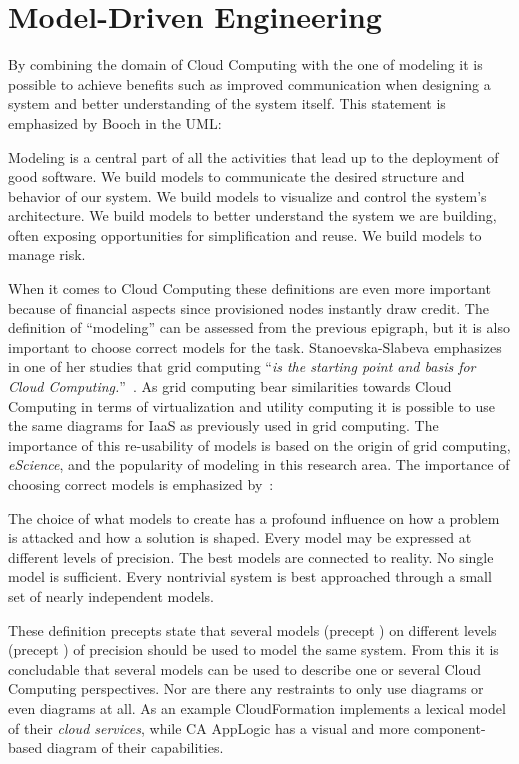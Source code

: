 \section{Model-Driven Engineering}

By combining the domain of Cloud Computing with the one of modeling 
it is possible to achieve benefits such as improved communication when designing 
a system and better understanding of the system itself.
This statement is emphasized by Booch \etal in the UML:
\epigraph{
  Modeling is a central
  part of all the activities that lead up to the deployment of good
  software. We build models to communicate the desired structure and
  behavior of our system. We build models to visualize and control the
  system's architecture. We build models to better understand the
  system we are building, often exposing opportunities for
  simplification and reuse. We build models to manage risk.
}{\citet{unified:booch05}}
When it comes to Cloud Computing these definitions are even more important
because of financial aspects since provisioned nodes instantly draw credit.
The definition of ``modeling'' can be assessed from the previous epigraph, but it is 
also important to choose correct models for the task.
Stanoevska-Slabeva emphasizes in one of her studies that grid computing
``\emph{is the starting point and basis for Cloud Computing.}''~\cite{introduction:wozniak10}.
As grid computing bear similarities towards Cloud Computing in terms of virtualization 
and utility computing
it is possible to use the same  diagrams for IaaS as previously used in grid computing.
The importance of this re-usability of models is based on the origin of grid computing, 
\emph{eScience},
and the popularity of modeling in this research area.
The importance of choosing correct models is emphasized by~\cite{unified:booch05}:
\epigraph{
  \begin{ii}\iitem The choice
  of what models to create has a profound influence on how a problem
  is attacked and how a solution is shaped. \iitem Every model may be
  expressed at different levels of precision. \iitem The best models
  are connected to reality. \iitem No single model is
  sufficient. Every nontrivial system is best approached through a
  small set of nearly independent models.\end{ii}
}{\citet{unified:booch05}}
These definition precepts state that several models (precept ) on different levels (precept ) 
of precision should be used to model the same system.
From this it is concludable that several models can be used to describe one or several Cloud Computing perspectives.
Nor are there any restraints to only use  diagrams or even diagrams at all.
As an example  CloudFormation implements a lexical model of their \emph{cloud services},
while CA AppLogic has a visual and more  component-based diagram of their capabilities.

